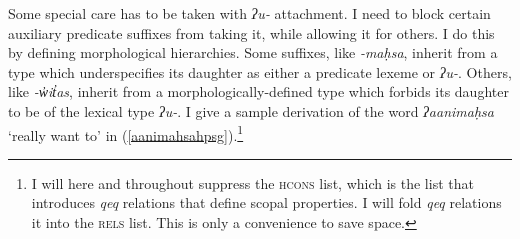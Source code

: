 Some special care has to be taken with \textit{ʔu-} attachment. I need to block certain auxiliary predicate suffixes from taking it, while allowing it for others. I do this by defining morphological hierarchies. Some suffixes, like \textit{-maḥsa}, inherit from a type which underspecifies its daughter as either a predicate lexeme or \textit{ʔu-}. Others, like \textit{-w̓it̓as}, inherit from a morphologically-defined type which forbids its daughter to be of the lexical type \textit{ʔu-}. I give a sample derivation of the word \textit{ʔaanimaḥsa} `really want to' in (\ref{aanimahsahpsg}).\footnote{I will here and throughout suppress the \textsc{hcons} list, which is the list that introduces \textit{qeq} relations that define scopal properties. I will fold \textit{qeq} relations it into the \textsc{rels} list. This is only a convenience to save space.}

